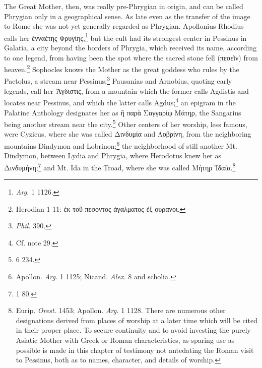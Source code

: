 \documentclass[a4paper, 11pt, oneside, polutonikogreek, english]{article}
\begin{document}
The Great Mother, then, was really pre-Phrygian in origin, and can be called Phrygian only in a geographical sense. As late even as the transfer of the image to Rome she was not yet generally regarded as Phrygian. Apollonius Rhodius calls her ἐνναέτης Φρυγίης,\footnote{\emph{Arg.} 1 1126.} but the cult had its strongest center in Pessinus in Galatia, a city beyond the borders of Phrygia, which received its name, according to one legend, from having been the spot where the sacred stone fell (πεσεῐν) from heaven.\footnote{Herodian 1 11: ἐκ τοῦ πεσοντος ἀγαλματος ἐξ ουρανοι.} Sophocles knows the Mother as the great goddess who rules by the Pactolus, a stream near Pessinus;\footnote{\emph{Phil.} 390.} Pausanias and Arnobius, quoting early legends, call her Ἄγδιστις, from a mountain which the former calls Agdistis and locates near Pessinus, and which the latter calls Agdus;\footnote{Cf. note 29.} an epigram in the Palatine Anthology designates her as ἢ παρὰ Σαγγαρίῳ Μάτηρ, the Sangarius being another stream near the city.\footnote{6 234.} Other centers of her worship, less famous, were Cyzicus, where she was called Δινδυμία and Λοβρίνη, from the neighboring mountains Dindymon and Lobrinon;\footnote{Apollon. \emph{Arg.} 1 1125; Nicand. \emph{Alex.} 8 and scholia.} the neighborhood of still another Mt. Dindymon, between Lydia and Phrygia, where Herodotus knew her as Δινδυμήνη;\footnote{1 80.} and Mt. Ida in the Troad, where she was called Μήτηρ Ἰδαία.\footnote{Eurip. \emph{Orest.} 1453; Apollon. \emph{Arg.} 1 1128. There are numerous other designations derived from places of worship at a later time which will be cited in their proper place. To secure continuity and to avoid investing the purely Asiatic Mother with Greek or Roman characteristics, as sparing use as possible is made in this chapter of testimony not antedating the Roman visit to Pessinus, both as to names, character, and details of worship.}
\end{document}

